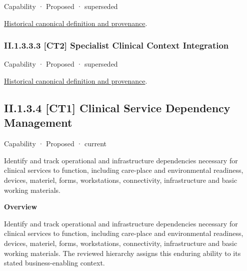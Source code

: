 \label{element:8430d50adc504ecc959f15b7cbbcd095}
{\small Capability · Proposed · superseded}\par
\href{../../../../continuum/strategy/capability/8430d50adc504ecc959f15b7cbbcd095.md}{Historical canonical definition and provenance}.\par
\subsubsection*{II.1.3.3.3 [CT2] Specialist Clinical Context Integration}
\label{navigation:II.1.3.3.3}

\label{element:062802a425d14530b0ce9434c5980d85}
{\small Capability · Proposed · superseded}\par
\href{../../../../continuum/strategy/capability/062802a425d14530b0ce9434c5980d85.md}{Historical canonical definition and provenance}.\par
\subsection*{II.1.3.4 [CT1] Clinical Service Dependency Management}
\label{navigation:II.1.3.4}

\label{element:232db9b8b47c450cb0aa9acaf539c09d}
{\small Capability · Proposed · current}\par

Identify and track operational and infrastructure dependencies necessary for clinical services to function, including care-place and environmental readiness, devices, materiel, forms, workstations, connectivity, infrastructure and basic working materials.



\textbf{Overview}



Identify and track operational and infrastructure dependencies necessary for clinical services to function, including care-place and environmental readiness, devices, materiel, forms, workstations, connectivity, infrastructure and basic working materials. The reviewed hierarchy assigns this enduring ability to its stated business-enabling context.



